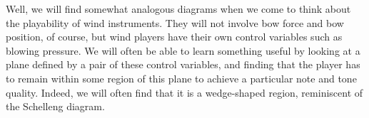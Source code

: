  Well, we will find somewhat analogous diagrams when we come to think about 
  the playability of wind instruments. They will not involve bow force and bow 
  position, of course, but wind players have their own control variables such 
  as blowing pressure. We will often be able to learn something useful by 
  looking at a plane defined by a pair of these control variables, and finding 
  that the player has to remain within some region of this plane to achieve a 
  particular note and tone quality. Indeed, we will often find that it is a 
  wedge-shaped region, reminiscent of the Schelleng diagram. 